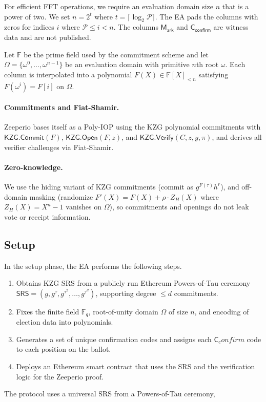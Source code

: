 \documentclass{llncs}
\begin{document}
For efficient FFT operations, we require an evaluation domain size $n$ that is a power of two. 
We set $n = 2^t$ where $t = \lceil \log_2 \mathcal{P} \rceil$. 
The EA pads the columns with zeros for indices $i$ where $\mathcal{P} \le i < n$. 
The columns $\mathsf{M_{ark}}$ and $\mathsf{C}_{\mathsf{confirm}}$ are witness data and are not published. 

Let $\mathbb{F}$ be the prime field used by the commitment scheme and let $\Omega=\{\omega^0,\dots,\omega^{n-1}\}$
be an evaluation domain with primitive $n$th root $\omega$. Each column is interpolated into a polynomial
$F(X)\in \mathbb{F}[X]_{<n}$ satisfying $F(\omega^i)=F[i]$ on $\Omega$.

\paragraph{Commitments and Fiat-Shamir.}
Zeeperio bases itself as a Poly-IOP using the KZG polynomial commitments with
$\mathsf{KZG.Commit}(F)$, $\mathsf{KZG.Open}(F,z)$, and $\mathsf{KZG.Verify}(C,z,y,\pi)$, and derives all verifier challenges via Fiat-Shamir.  

\paragraph{Zero-knowledge.}
We use the hiding variant of KZG commitments (commit as $g^{F(\tau)}h^r$), and
off-domain masking (randomize $F'(X)=F(X)+\rho\cdot Z_H(X)$ where $Z_H(X)=X^n-1$ vanishes on $\Omega$),
so commitments and openings do not leak vote or receipt information.  

\subsection{Setup}
In the setup phase, the EA performs the following steps.
\begin{enumerate}[label=(S\arabic*)]
  \item Obtains KZG SRS from a publicly run Ethereum Powers-of-Tau ceremony $\mathsf{SRS}=(g,g^\tau,g^{\tau^2},\dots,g^{\tau^d})$, supporting degree $\le d$ commitments. 
  \item Fixes the finite field $\mathbb{F}_q$, root-of-unity domain $\Omega$ of size $n$, and encoding of election data into polynomials.
  \item Generates a set of unique confirmation codes and assigns each $\mathsf{C}_confirm$ code to each position on the ballot.
  \item Deploys an Ethereum smart contract that uses the SRS and the verification logic for the Zeeperio proof.
\end{enumerate}
The protocol uses a universal SRS from a Powers-of-Tau ceremony,
 
\end{document}
